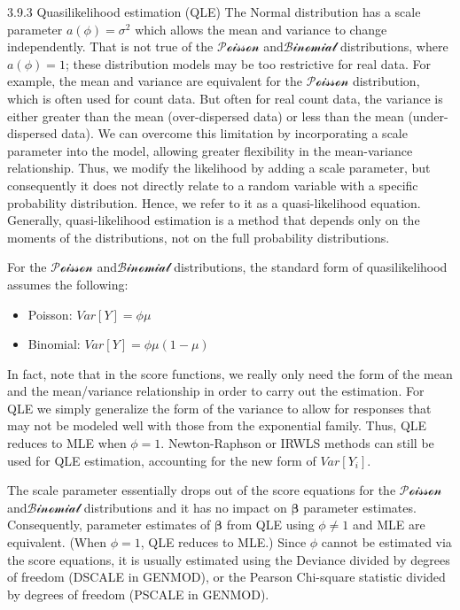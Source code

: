 \documentclass[
  9pt,
  ignorenonframetext,
]{beamer}
\begin{document}
\begin{frame}{3.9.3 Quasilikelihood estimation (QLE)}
\protect\hypertarget{quasilikelihood-estimation-qle}{}
The Normal distribution has a scale parameter \(a(\phi)=\sigma^2\) which
allows the mean and variance to change independently. That is not true
of the \(\mathcal {Poisson}\) and\(\mathcal {Binomial}\) distributions,
where \(a(\phi)=1\); these distribution models may be too restrictive
for real data. For example, the mean and variance are equivalent for the
\(\mathcal {Poisson}\) distribution, which is often used for count data.
But often for real count data, the variance is either greater than the
mean (over-dispersed data) or less than the mean (under-dispersed data).
We can overcome this limitation by incorporating a scale parameter into
the model, allowing greater flexibility in the mean-variance
relationship. Thus, we modify the likelihood by adding a scale
parameter, but consequently it does not directly relate to a random
variable with a specific probability distribution. Hence, we refer to it
as a quasi-likelihood equation. Generally, quasi-likelihood estimation
is a method that depends only on the moments of the distributions, not
on the full probability distributions.

For the \(\mathcal {Poisson}\) and\(\mathcal {Binomial}\) distributions,
the standard form of quasilikelihood assumes the following:

\begin{itemize}
\item
  Poisson: \(Var[Y]=\phi\mu\)
\item
  Binomial: \(Var[Y]=\phi\mu(1-\mu)\)
\end{itemize}
\end{frame}

\begin{frame}{}
\protect\hypertarget{section-11}{}
In fact, note that in the score functions, we really only need the form
of the mean and the mean/variance relationship in order to carry out the
estimation. For QLE we simply generalize the form of the variance to
allow for responses that may not be modeled well with those from the
exponential family. Thus, QLE reduces to MLE when \(\phi=1\).
Newton-Raphson or IRWLS methods can still be used for QLE estimation,
accounting for the new form of \(Var[Y_i]\).

The scale parameter essentially drops out of the score equations for the
\(\mathcal {Poisson}\) and\(\mathcal {Binomial}\) distributions and it
has no impact on \(\pmb \beta\) parameter estimates. Consequently,
parameter estimates of \(\pmb \beta\) from QLE using \(\phi \neq 1\) and
MLE are equivalent. (When \(\phi=1\), QLE reduces to MLE.) Since
\(\phi\) cannot be estimated via the score equations, it is usually
estimated using the Deviance divided by degrees of freedom (DSCALE in
GENMOD), or the Pearson Chi-square statistic divided by degrees of
freedom (PSCALE in GENMOD).
\end{frame}
\end{document}
